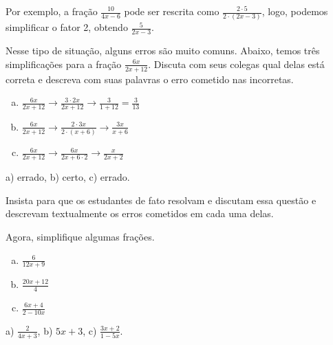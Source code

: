 \documentclass[main.tex]{subfiles}
\begin{document}
Por exemplo, a fração $\frac{10}{4x-6}$ pode ser rescrita como $\frac{2 \cdot 5}{2 \cdot (2x-3)}$, logo, podemos simplificar o fator 2, obtendo $\frac{5}{2x-3}$.

\begin{questao}
Nesse tipo de situação, alguns erros são muito comuns. Abaixo, temos três simplificações para a fração $\frac{6x}{2x+12}$. Discuta com seus colegas qual delas está correta e descreva com suas palavras o erro cometido nas incorretas.
\begin{enumerate}[a)]
\item $\frac{6x}{2x+12} \longrightarrow \frac{3 \cdot 2x}{2x+12} \longrightarrow \frac{3}{1+12} = \frac{3}{13}$
\item $\frac{6x}{2x+12} \longrightarrow \frac{2 \cdot 3x}{2 \cdot(x+6)} \longrightarrow \frac{3x}{x+6}$
\item $\frac{6x}{2x+12} \longrightarrow \frac{6x}{2x+6 \cdot 2} \longrightarrow \frac{x}{2x+2}$
\end{enumerate}
\end{questao}

\begin{gabarito}
	\begin{gabaritoQuestao}
		a) errado, b) certo, c) errado.
	\end{gabaritoQuestao}
\end{gabarito}

\paraTutores

Insista para que os estudantes de fato resolvam e discutam essa questão e descrevam textualmente os erros cometidos em cada uma delas.

\paraAmbos

\begin{questao}
Agora, simplifique algumas frações.
\begin{enumerate}[a)]
\item $\frac{6}{12x+9}$
\item $\frac{20x+12}{4}$
\item $\frac{6x+4}{2-10x}$
\end{enumerate}
\end{questao}

\begin{gabarito}
	\begin{gabaritoQuestao}
		a) $\frac{2}{4x+3}$, b) $5x+3$, c) $\frac{3x+2}{1-5x}$.
	\end{gabaritoQuestao}
\end{gabarito}
\end{document}
